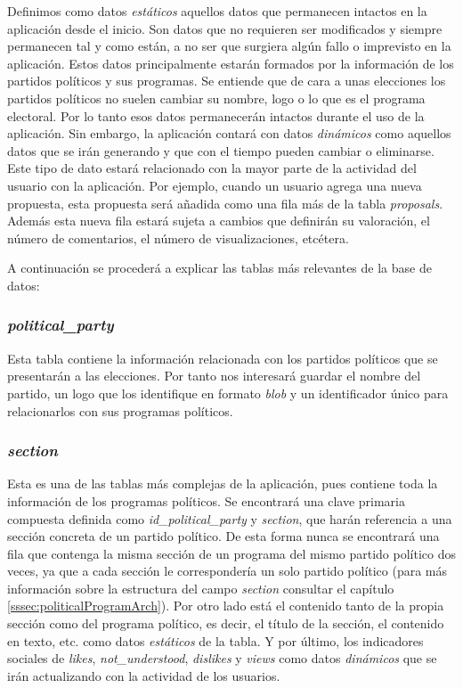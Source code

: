 Definimos como datos \textit{estáticos} aquellos datos que permanecen intactos en la aplicación desde el inicio. Son datos que no requieren ser modificados y siempre permanecen tal y como están, a no ser que surgiera algún fallo o imprevisto en la aplicación. Estos datos principalmente estarán formados por la información de los partidos políticos y sus programas. Se entiende que de cara a unas elecciones los partidos políticos no suelen cambiar su nombre, logo o lo que es el programa electoral. Por lo tanto esos datos permanecerán intactos durante el uso de la aplicación. Sin embargo, la aplicación contará con datos \textit{dinámicos} como aquellos datos que se irán generando y que con el tiempo pueden cambiar o eliminarse. Este tipo de dato estará relacionado con la mayor parte de la actividad del usuario con la aplicación. Por ejemplo, cuando un usuario agrega una nueva propuesta, esta propuesta será añadida como una fila más de la tabla \textit{proposals}. Además esta nueva fila estará sujeta a cambios que definirán su valoración, el número de comentarios, el número de visualizaciones, etcétera.

A continuación se procederá a explicar las tablas más relevantes de la base de datos:

\subsubsection{\textit{political\_party}}

Esta tabla contiene la información relacionada con los partidos políticos que se presentarán a las elecciones. Por tanto nos interesará guardar el nombre del partido, un logo que los identifique en formato \textit{blob} y un identificador único para relacionarlos con sus programas políticos.

\subsubsection{\textit{section}}

Esta es una de las tablas más complejas de la aplicación, pues contiene toda la información de los programas políticos. Se encontrará una clave primaria compuesta definida como \textit{id\_political\_party} y \textit{section}, que harán referencia a una sección concreta de un partido político. De esta forma nunca se encontrará una fila que contenga la misma sección de un programa del mismo partido político dos veces, ya que a cada sección le correspondería un solo partido político (para más información sobre la estructura del campo \textit{section} consultar el capítulo \ref{sssec:politicalProgramArch}). Por otro lado está el contenido tanto de la propia sección como del programa político, es decir, el título de la sección, el contenido en texto, etc. como datos \textit{estáticos} de la tabla. Y por último, los indicadores sociales de \textit{likes}, \textit{not\_understood}, \textit{dislikes} y \textit{views} como datos \textit{dinámicos} que se irán actualizando con la actividad de los usuarios.

